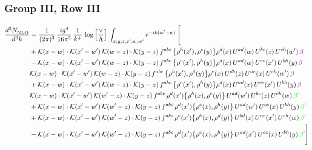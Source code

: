 \documentclass[9pt]{article}
\numberwithin{equation}{section}
\begin{document}
\subsubsection{Group III, Row III} 
\begin{align}
     \frac{d^{3}N_{\rm NLO}^{\rm}}{d^{3}k}  & = \frac{1}{(2\pi)^{3}}\, \frac{ig^{4}}{16\pi^{5}}\, \frac{1}{k^{+}}\, \log{\left[\frac{\vee}{\Lambda}\right]}\, \int_{x,y,z,x^{\prime},w,w^{\prime}}e^{-ik(w^{\prime}-w)}\, \Bigg[\notag \\ & +\mathcal{K}(x-w)\cdot\mathcal{K}(x'-w')\,\mathcal{K}(w-z)\cdot\mathcal{K}(y-z)\, f^{abc}\,\big\{\rho^{h}(x'),\rho^{e}(y)\big\}\rho^{d}(x)\,U^{ad}(w)\,U^{be}(z)\,U^{ch}(w')\,{\color{violet}\beta}\notag\\
&-\mathcal{K}(x-w)\cdot\mathcal{K}(x'-w')\,\mathcal{K}(w-z)\cdot\mathcal{K}(y-z)\, f^{abc}\,\big\{\rho^{e}(x'),\rho^{h}(y)\big\}\rho^{d}(x)\,U^{ad}(w)\,U^{ce}(x')\,U^{bh}(y)\,{\color{violet}\beta}\notag\\ &\-\mathcal{K}(x-w)\cdot\mathcal{K}(x'-w')\,\mathcal{K}(w-z)\cdot\mathcal{K}(y-z)\, f^{abc}\,\big\{\rho^{h}(x'),\rho^{d}(y)\big\}\rho^{e}(x)\,U^{db}(z)\,U^{ae}(x)\,U^{ch}(w')\,{\color{violet}\beta}\notag\\ & +\mathcal{K}(x-w)\cdot\mathcal{K}(x'-w')\,\mathcal{K}(w-z)\cdot\mathcal{K}(y-z)\, f^{abc}\,\big\{\rho^{e}(x'),\rho^{h}(y)\big\}\rho^{d}(x)\,U^{ad}(x)\,U^{ce}(x')\,U^{bh}(y)\,{\color{violet}\beta}\notag\\ &\-\mathcal{K}(x-w)\cdot\mathcal{K}(x'-w')\,\mathcal{K}(w'-z)\cdot\mathcal{K}(y-z)\, f^{abc}\,\rho^{d}(x')\big\{\rho^{h}(x),\rho^{e}(y)\big\}\,U^{ad}(w')\,U^{be}(z)\,U^{ch}(w)\,{\color{green}\beta'}\notag\\ &+\mathcal{K}(x-w)\cdot\mathcal{K}(x'-w')\,\mathcal{K}(w'-z)\cdot\mathcal{K}(y-z)\, f^{abc}\,\rho^{d}(x')\big\{\rho^{e}(x),\rho^{h}(y)\big\}\,U^{ad}(w')\,U^{ce}(x)\,U^{bh}(y)\,{\color{green}\beta'} \notag\\ & +\mathcal{K}(x-w)\cdot\mathcal{K}(x'-w')\,\mathcal{K}(w'-z)\cdot\mathcal{K}(y-z)\, f^{abc}\,\rho^{e}(x')\big\{\rho^{h}(x),\rho^{d}(y)\big\}\,U^{bd}(z)\,U^{ae}(x')\,U^{ch}(w)\,{\color{green}\beta'} \notag\\ & -\mathcal{K}(x-w)\cdot\mathcal{K}(x'-w')\,\mathcal{K}(w'-z)\cdot\mathcal{K}(y-z)\, f^{abc}\,\rho^{d}(x')\big\{\rho^{e}(x),\rho^{h}(y)\big\}\,U^{ad}(x')\,U^{ce}(x)\,U^{bh}(y)\,{\color{green}\beta'}\Bigg]\end{align}     
\end{document}
